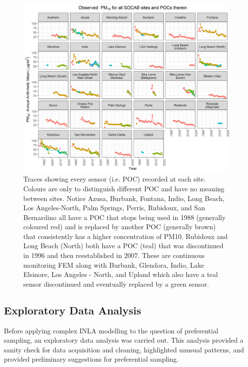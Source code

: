 \documentclass{article}
\begin{document}
\begin{figure}[ht]
	\centering
	\includegraphics[width = \textwidth]{Figures/POC_all_trace.png}
	\caption{Traces showing every sensor (i.e. \ac{POC}) recorded at each site.  Colours are only to distinguish different \ac{POC} and have no meaning between sites.  Notice Azusa, Burbank, Fontana, Indio, Long Beach, Los Angeles-North, Palm Springs, Perris, Rubidoux, and San Bernardino all have a \ac{POC} that stops being used in 1988 (generally coloured red) and is replaced by another \ac{POC} (generally brown) that consistently has a higher concentration of PM10.  Rubidoux and Long Beach (North) both have a \ac{POC} (teal) that was discontinued in 1996 and then reestablished in 2007. These are continuous monitoring \ac{FEM} along with Burbank, Glendora, Indio, Lake Elsinore, Los Angeles - North, and Upland which also have a teal sensor discontinued and eventually replaced by a green sensor.}
	\label{fig:POC_all_trace}
\end{figure}

\subsection{Exploratory Data Analysis}
\label{subsec:eda}
Before applying complex INLA modelling to the question of preferential sampling, an exploratory data analysis was carried out.  This analysis provided a sanity check for data acquisition and cleaning, highlighted unusual patterns, and provided preliminary suggestions for preferential sampling.
\end{document}
